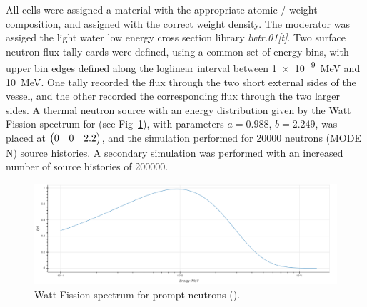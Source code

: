 \documentclass{article}
\begin{document}
    All cells were assigned a material with the appropriate atomic / weight composition, and assigned with the correct weight density. The moderator was assiged the light water low energy cross section library \textit{lwtr.01[t]}.
    Two surface neutron flux tally cards were defined, using a common set of energy bins, with upper bin edges defined along the loglinear interval between \SI{1e-9}{\MeV} and \SI{10}{\MeV}. One tally recorded the flux through the two short external sides of the vessel, and the other recorded the corresponding flux through the two larger sides.
    A thermal neutron source with an energy distribution given by the Watt Fission spectrum for  (see Fig~\ref{fig:watt_fission}), with parameters $a=0.988$, $b=2.249$, was placed at $\mqty(0 & 0 & 2.2)$, and the simulation performed for \num{20000} neutrons (MODE N) source histories. A secondary simulation was performed with an increased number of source histories of \num{200000}.
    \begin{figure}[htb]
      \centering
      \includegraphics[width=\textwidth]{watt_spectrum_235_u.png}
      \caption{Watt Fission spectrum for prompt neutrons ().} %
      \label{fig:watt_fission}
    \end{figure}
\end{document}
